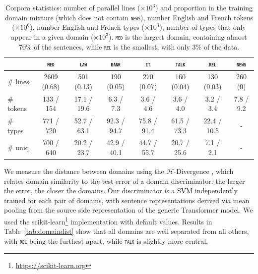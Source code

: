 \documentclass[11pt,a4paper]{article}
\newcommand{\fyTodo}[1]{\Todo[FY:]{\textcolor{orange}{#1}}}
\newcommand{\fyDone}[1]{\done[FY]\Todo[FY:]{\textcolor{orange}{#1}}}
\newcommand{\revision}[1]{#1}
\newcommand{\domain}[1]{\texttt{\textsc{#1}}}
\begin{document}
\begin{table}[htbp]
  \centering
  \begin{tabular}{|l|ccccccc|} %
    \cline{2-8} 
    \multicolumn{1}{c|}{} & \multicolumn{1}{c}{\domain{med}} & \multicolumn{1}{c}{\domain{law}} & \multicolumn{1}{c}{\domain{bank}} & \multicolumn{1}{c}{\domain{it}} & \multicolumn{1}{c}{\domain{talk}} & \multicolumn{1}{c}{\domain{rel}} & \multicolumn{1}{c|}{\domain{news}} \\
    \hline 
    \# lines & 2609 (0.68) & 501 (0.13) & 190 (0.05) & 270 (0.07) & 160 (0.04) & 130 (0.03) & 260 (0) \\
    \# \revision{tokens}  &  133 / 154  &  17.1 / 19.6 &  6.3 / 7.3 &  3.6 / 4.6 &  3.6 / 4.0 &  3.2 / 3.4 & 7.8 / 9.2   \\
    \# \revision{types}  & 771 / 720 & 52.7 / 63.1 & 92.3 / 94.7 & 75.8 / 91.4 & 61.5 / 73.3 & 22.4 / 10.5 & - \\
    \# \revision{uniq} & 700 / 640 & 20.2 / 23.7 & 42.9 / 40.1 & 44.7 / 55.7 & 20.7 / 25.6 & 7.1 / 2.1 & - \\
    \hline
  \end{tabular}
  \caption{Corpora statistics: number of parallel lines ($\times 10^3$) and proportion in the training domain mixture (which does not contain \domain{news}), number English and French tokens ($\times 10^6$), number English and French types ($\times 10^3$), number of types that only appear in a given domain ($\times 10^3$). \domain{med} is the largest domain, containing almost 70\% of the sentences, while \domain{rel} is the smallest, with only 3\% of the data.
  }
\label{tab:Corpora}
\end{table}

\fyTodo{Keep this ?}
We measure the distance between domains using the $\mathcal{H}$-Divergence \cite{Ben-David09atheory}, which relates domain similarity to the test error of a domain discriminator: the larger the error, the closer the domains.
Our discriminator is a SVM independently trained for each pair of domains, with sentence representations derived via mean pooling from the source side representation of the generic Transformer model. We used the scikit-learn\footnote{\url{https://scikit-learn.org}} implementation with default values.\fyDone{Inform the classifier details}\fyDone{Insert tableau} Results in Table~\ref{tab:domaindist} show that all domains are well separated from all others, with \domain{rel} being the furthest apart, while \domain{talk} is slightly more central.
\end{document}
